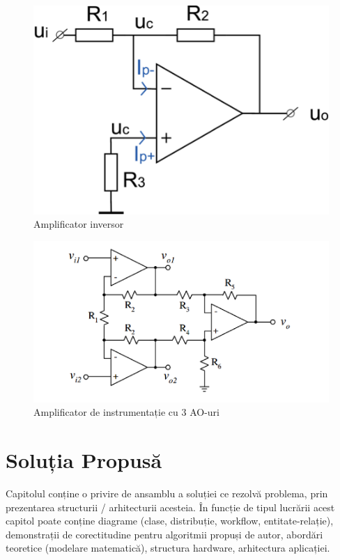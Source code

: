 \documentclass[12pt,a4paper]{report}
\begin{document}
\begin{figure}[th]
\centering
\includegraphics{pics/Pic1.png}
  \caption{Amplificator inversor}
  \label{fig:pic1}
\end{figure}

\newpage

\begin{figure}[th]
\centering
\includegraphics{pics/Pic2.png}
  \caption[Amplificator de instrumentație cu 3 AO-uri]{Amplificator de instrumentație cu 3 AO-uri\protect\footnotemark}
  \label{fig:pic2}
\end{figure}

\chapter{Soluția Propusă}
Capitolul conține o privire de ansamblu a soluției ce rezolvă problema, prin prezentarea structurii / arhitecturii acesteia. În funcție de tipul lucrării acest capitol poate conține diagrame (clase, distribuție, workflow, entitate-relație), demonstrații de corectitudine pentru algoritmii propuși de autor, abordări teoretice (modelare matematică), structura hardware, arhitectura aplicației.
\end{document}
